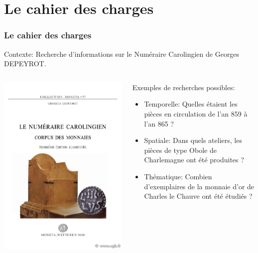 \documentclass[10pt, compress]{beamer}
\begin{document}
\section{Le cahier des charges}
\begin{frame}[fragile]
	\frametitle{Le cahier des charges}
	Contexte: Recherche d'informations sur le Numéraire Carolingien de Georges DEPEYROT.
	\begin{columns}
			\includegraphics[scale=0.2]{img/depeyrot.jpg}
		\onslide<1>
		\begin{scriptsize}
			Exemples de recherches possibles:
			\begin{itemize}
				[square]
				\item{Temporelle: Quelles étaient les pièces en circulation de l’an 859 à l’an 865 ?}
				\item{Spatiale: Dans quels ateliers, les pièces de type Obole de Charlemagne ont été produites ?}
				\item{Thématique: Combien d’exemplaires de la monnaie d’or de Charles le Chauve ont été étudiés ?}
			\end{itemize}	
		\end{scriptsize}
	\end{columns}
\end{frame}
\end{document}
